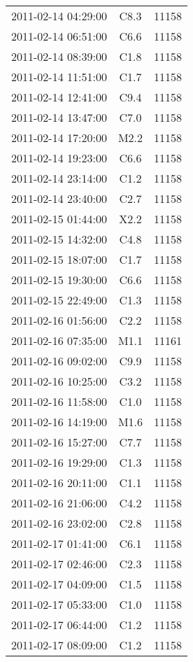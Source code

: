 \documentclass{article}
\begin{document}
\begin{table}
\begin{tabular}{c|c|c}
			2011-02-14 04:29:00 & C8.3 & 11158 \\ 
			2011-02-14 06:51:00 & C6.6 & 11158 \\ 
			2011-02-14 08:39:00 & C1.8 & 11158 \\ 
			2011-02-14 11:51:00 & C1.7 & 11158 \\ 
			2011-02-14 12:41:00 & C9.4 & 11158 \\ 
			2011-02-14 13:47:00 & C7.0 & 11158 \\ 
			2011-02-14 17:20:00 & M2.2 & 11158 \\ 
			2011-02-14 19:23:00 & C6.6 & 11158 \\ 
			2011-02-14 23:14:00 & C1.2 & 11158 \\ 
			2011-02-14 23:40:00 & C2.7 & 11158 \\ 
			2011-02-15 01:44:00 & X2.2 & 11158 \\ 
			2011-02-15 14:32:00 & C4.8 & 11158 \\ 
			2011-02-15 18:07:00 & C1.7 & 11158 \\ 
			2011-02-15 19:30:00 & C6.6 & 11158 \\ 
			2011-02-15 22:49:00 & C1.3 & 11158 \\ 
			2011-02-16 01:56:00 & C2.2 & 11158 \\ 
			2011-02-16 07:35:00 & M1.1 & 11161 \\ 
			2011-02-16 09:02:00 & C9.9 & 11158 \\ 
			2011-02-16 10:25:00 & C3.2 & 11158 \\ 
			2011-02-16 11:58:00 & C1.0 & 11158 \\ 
			2011-02-16 14:19:00 & M1.6 & 11158 \\ 
			2011-02-16 15:27:00 & C7.7 & 11158 \\ 
			2011-02-16 19:29:00 & C1.3 & 11158 \\ 
			2011-02-16 20:11:00 & C1.1 & 11158 \\ 
			2011-02-16 21:06:00 & C4.2 & 11158 \\ 
			2011-02-16 23:02:00 & C2.8 & 11158 \\ 
			2011-02-17 01:41:00 & C6.1 & 11158 \\ 
			2011-02-17 02:46:00 & C2.3 & 11158 \\ 
			2011-02-17 04:09:00 & C1.5 & 11158 \\ 
			2011-02-17 05:33:00 & C1.0 & 11158 \\ 
			2011-02-17 06:44:00 & C1.2 & 11158 \\ 
			2011-02-17 08:09:00 & C1.2 & 11158 \\ 

\end{tabular}
\end{table}
\end{document}
